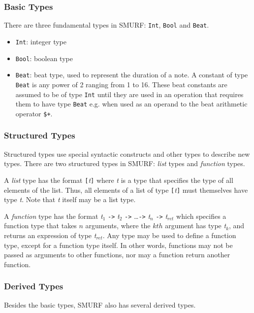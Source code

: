 \subsubsection{Basic Types}
\label{sec:basictype}
There are three fundamental types in SMURF: \texttt{Int}, \texttt{Bool} and \texttt{Beat}. 
\begin{itemize}
\item \texttt{Int}: integer type
\item \texttt{Bool}: boolean type
\item \texttt{Beat}: beat type, used to represent the duration of a note. A constant of type
			\texttt{Beat} is any power of 2 ranging from 1 to 16. These beat constants are assumed to be
			of type \texttt{Int} until they are used in an operation that requires them to have type \texttt{Beat} e.g.
			when used as an operand to the beat arithmetic operator \texttt{\$+}.
\end{itemize}

\subsubsection{Structured Types}
\label{sec:structtype}
Structured types use special syntactic constructs and other types to describe new types. 
There are two structured types in SMURF: {\it list} types and {\it function} types.

A {\it list} type has the format \texttt{[}\emph{t}\texttt{]} where \emph{t} is a type that specifies the type
of all elements of the list. Thus, all elements of a list of type \texttt{[}\emph{t}\texttt{]}
must themselves have type \emph{t}. Note that \emph{t} itself may be a list type.

A {\it function} type has the format \emph{t$_1$} \texttt{->} \emph{t$_2$} \texttt {->}
\dots \texttt{->} \emph {t$_n$} \texttt{->} \emph{t$_{ret}$} which specifies a function type
that takes $n$ arguments, where the $kth$ argument has type \emph{t$_k$}, and returns an expression
of type \emph{t$_{ret}$}. Any type may be used to define a function type, except for a function
type itself. In other words, functions may not be passed as arguments to other functions, nor may
a function return another function.


\subsubsection{Derived Types}
\label{sec:derivedtype}
Besides the basic types, SMURF also has several derived types. 

